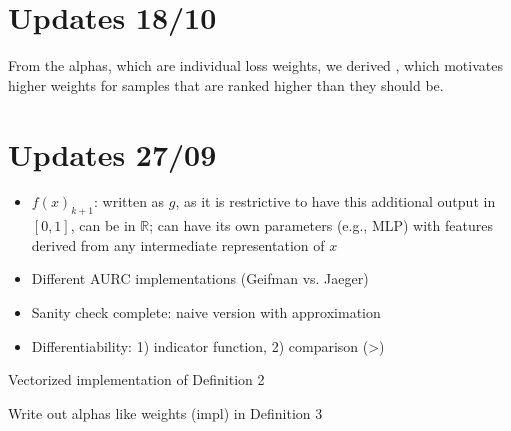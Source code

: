 \section*{Updates 18/10}

From the alphas, which are individual loss weights, we derived , which motivates higher weights for samples that are ranked higher than they should be.





\section*{Updates 27/09}

\begin{itemize} %
    \item $f(x)_{k+1}$: written as $g$, as it is restrictive to have this additional output in $[0,1]$, can be in $\mathbb{R}$; can have its own parameters (e.g., MLP) with features derived from any intermediate representation of $x$
    \item Different AURC implementations (Geifman vs. Jaeger)
    \item Sanity check complete: naive version with approximation
    \item Differentiability: 1) indicator function, 2) comparison (>)
\end{itemize}

\begin{todolist}
\item Vectorized implementation of Definition 2
\item Write out alphas like weights (impl) in Definition 3
\end{todolist}


